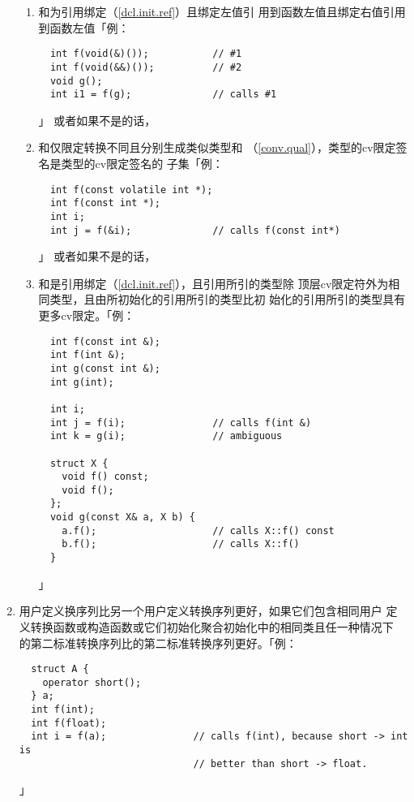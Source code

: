 \begin{enumerate}
{\begin{enumerate}
{\begin{lstlisting}
  struct A {
    A& operator<<(int);
    void p() &;
    void p() &&;
  };
  A& operator<<(A&&, char);
  A() << 1;                   // calls A::operator<<(int)
  A() << 'c';                 // calls operator<<(A&&, char)
  A a;
  a << 1;                     // calls A::operator<<(int)
  a << 'c';                   // calls A::operator<<(int)
  A().p();                    // calls A::p()&&
  a.p();                      // calls A::p()&
\end{lstlisting}」
        或者如果不是的话，}
      \item{和为引用绑定（\ref{dcl.init.ref}）且绑定左值引
        用到函数左值且绑定右值引用到函数左值「例：
\begin{lstlisting}
  int f(void(&)());           // #1
  int f(void(&&)());          // #2
  void g();
  int i1 = f(g);              // calls #1
\end{lstlisting}」
        或者如果不是的话，}
      \item{和仅限定转换不同且分别生成类似类型和
        （\ref{conv.qual}），类型的cv限定签名是类型的cv限定签名的
        子集「例：
\begin{lstlisting}
  int f(const volatile int *);
  int f(const int *);
  int i;
  int j = f(&i);              // calls f(const int*)
\end{lstlisting}」
        或者如果不是的话，}
      \item{和是引用绑定（\ref{dcl.init.ref}），且引用所引的类型除
        顶层cv限定符外为相同类型，且由所初始化的引用所引的类型比初
        始化的引用所引的类型具有更多cv限定。「例：
\begin{lstlisting}
  int f(const int &);
  int f(int &);
  int g(const int &);
  int g(int);

  int i;
  int j = f(i);               // calls f(int &)
  int k = g(i);               // ambiguous

  struct X {
    void f() const;
    void f();
  };
  void g(const X& a, X b) {
    a.f();                    // calls X::f() const
    b.f();                    // calls X::f()
  }
\end{lstlisting}」}
    \end{enumerate}}
  \item{用户定义换序列比另一个用户定义转换序列更好，如果它们包含相同用户
    定义转换函数或构造函数或它们初始化聚合初始化中的相同类且任一种情况下
    的第二标准转换序列比的第二标准转换序列更好。「例：
\begin{lstlisting}
  struct A {
    operator short();
  } a;
  int f(int);
  int f(float);
  int i = f(a);               // calls f(int), because short -> int is
                              // better than short -> float.
\end{lstlisting}」}
\end{enumerate}

